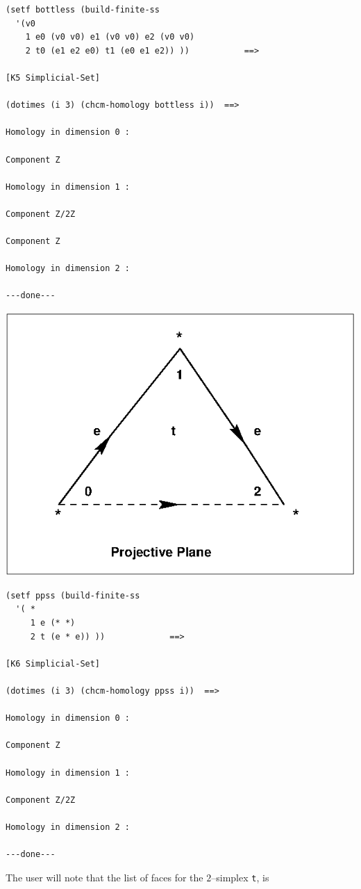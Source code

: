 \vskip 0.40cm
%
{\footnotesize\begin{verbatim}
(setf bottless (build-finite-ss 
  '(v0
    1 e0 (v0 v0) e1 (v0 v0) e2 (v0 v0)
    2 t0 (e1 e2 e0) t1 (e0 e1 e2)) ))           ==>

[K5 Simplicial-Set]

(dotimes (i 3) (chcm-homology bottless i))  ==>

Homology in dimension 0 :

Component Z

Homology in dimension 1 :

Component Z/2Z

Component Z

Homology in dimension 2 :

---done---
\end{verbatim}}
\newpage
%
\vskip 0.40cm
\centerline{\includegraphics{ppss.eps}}
\vskip 0.40cm
%
{\footnotesize\begin{verbatim}
(setf ppss (build-finite-ss 
  '( *
     1 e (* *)
     2 t (e * e)) ))             ==>

[K6 Simplicial-Set]

(dotimes (i 3) (chcm-homology ppss i))  ==>

Homology in dimension 0 :

Component Z

Homology in dimension 1 :

Component Z/2Z

Homology in dimension 2 :

---done---
\end{verbatim}}
The user will note that the list of faces for the $2$--simplex {\tt t}, is
